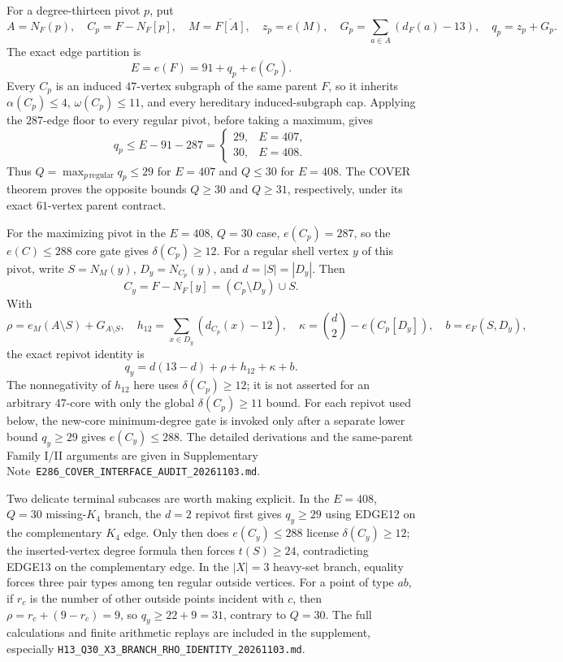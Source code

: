 \documentclass[11pt]{article}
\theoremstyle{definition}
\theoremstyle{remark}
\begin{document}
For a degree-thirteen pivot $p$, put
\[
 A=N_F(p),\quad C_p=F-N_F[p],\quad
 M=\overline{F[A]},\quad z_p=e(M),\quad
 G_p=\sum_{a\in A}(d_F(a)-13),\quad q_p=z_p+G_p.
\]
The exact edge partition is
\[
  E=e(F)=91+q_p+e(C_p).
\]
Every $C_p$ is an induced $47$-vertex subgraph of the same parent $F$,
so it inherits $\alpha(C_p)\leq4$, $\omega(C_p)\leq11$, and every
hereditary induced-subgraph cap. Applying the $287$-edge floor to every
regular pivot, before taking a maximum, gives
\[
 q_p\leq E-91-287=
 \begin{cases}
 29,&E=407,\\
 30,&E=408.
 \end{cases}
\]
Thus $Q=\max_{p\,\mathrm{regular}} q_p\leq29$ for $E=407$ and $Q\leq30$ for $E=408$.
The COVER theorem proves the opposite bounds $Q\geq30$ and $Q\geq31$,
respectively, under its exact $61$-vertex parent contract.

For the maximizing pivot in the $E=408$, $Q=30$ case,
$e(C_p)=287$, so the $e(C)\leq288$ core gate gives
$\delta(C_p)\geq12$. For a regular shell vertex $y$ of this pivot,
write $S=N_M(y)$, $D_y=N_{C_p}(y)$, and $d=|S|=|D_y|$. Then
\[
 C_y=F-N_F[y]=(C_p\setminus D_y)\cup S.
\]
With
\[
 \rho=e_M(A\setminus S)+G_{A\setminus S},\quad
 h_{12}=\sum_{x\in D_y}(d_{C_p}(x)-12),\quad
 \kappa=\binom d2-e(C_p[D_y]),\quad b=e_F(S,D_y),
\]
the exact repivot identity is
\[
 q_y=d(13-d)+\rho+h_{12}+\kappa+b.
\]
The nonnegativity of $h_{12}$ here uses $\delta(C_p)\geq12$; it is
not asserted for an arbitrary 47-core with only the global
$\delta(C_p)\geq11$ bound. For each repivot used below, the new-core
minimum-degree gate is invoked only after a separate lower bound
$q_y\geq29$ gives $e(C_y)\leq288$.
The detailed derivations and the same-parent Family I/II arguments are
given in Supplementary Note~\texttt{E286\_COVER\_INTERFACE\_AUDIT\_20261103.md}.

Two delicate terminal subcases are worth making explicit. In the
$E=408$, $Q=30$ missing-$K_4$ branch, the $d=2$ repivot first gives
$q_y\geq29$ using EDGE12 on the complementary $K_4$ edge. Only then
does $e(C_y)\leq288$ license $\delta(C_y)\geq12$; the inserted-vertex
degree formula then forces $t(S)\geq24$, contradicting EDGE13 on the
complementary edge. In the $|X|=3$ heavy-set branch, equality forces
three pair types among ten regular outside vertices. For a point of type
$ab$, if $r_c$ is the number of other outside points incident with $c$,
then $\rho=r_c+(9-r_c)=9$, so $q_y\geq22+9=31$, contrary to $Q=30$.
The full calculations and finite arithmetic replays are included in the
supplement, especially \texttt{H13\_Q30\_X3\_BRANCH\_RHO\_IDENTITY\_20261103.md}.
\end{document}
